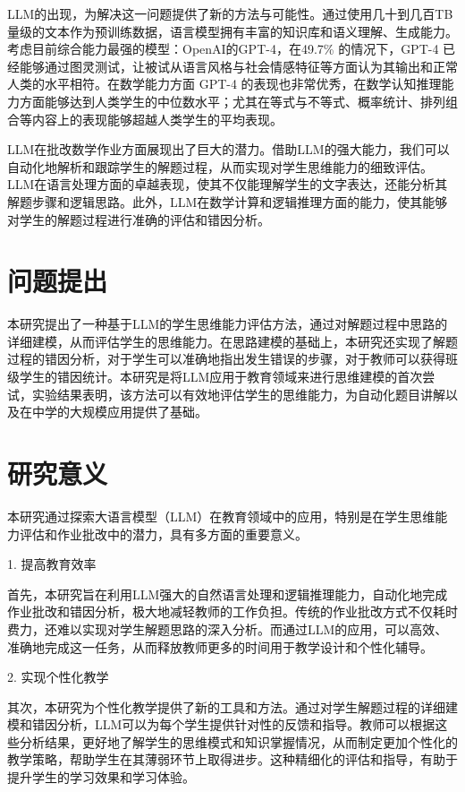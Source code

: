 LLM的出现，为解决这一问题提供了新的方法与可能性。通过使用几十到几百TB量级的文本作为预训练数据，语言模型拥有丰富的知识库和语义理解、生成能力。考虑目前综合能力最强的模型：OpenAI的GPT-4，在49.7\% 的情况下，GPT-4 已经能够通过图灵测试，让被试从语言风格与社会情感特征等方面认为其输出和正常人类的水平相符\cite{jones2024does}。在数学能力方面 GPT-4 的表现也非常优秀，在数学认知推理能力方面能够达到人类学生的中位数水平；尤其在等式与不等式、概率统计、排列组合等内容上的表现能够超越人类学生的平均表现\cite{zhuang2023efficiently}。

LLM在批改数学作业方面展现出了巨大的潜力。借助LLM的强大能力，我们可以自动化地解析和跟踪学生的解题过程，从而实现对学生思维能力的细致评估。LLM在语言处理方面的卓越表现，使其不仅能理解学生的文字表达，还能分析其解题步骤和逻辑思路。此外，LLM在数学计算和逻辑推理方面的能力，使其能够对学生的解题过程进行准确的评估和错因分析。


\section{问题提出}

本研究提出了一种基于LLM的学生思维能力评估方法，通过对解题过程中思路的详细建模，从而评估学生的思维能力。在思路建模的基础上，本研究还实现了解题过程的错因分析，对于学生可以准确地指出发生错误的步骤，对于教师可以获得班级学生的错因统计。本研究是将LLM应用于教育领域来进行思维建模的首次尝试，实验结果表明，该方法可以有效地评估学生的思维能力，为自动化题目讲解以及在中学的大规模应用提供了基础。


\section{研究意义}
本研究通过探索大语言模型（LLM）在教育领域中的应用，特别是在学生思维能力评估和作业批改中的潜力，具有多方面的重要意义。

1. 提高教育效率

首先，本研究旨在利用LLM强大的自然语言处理和逻辑推理能力，自动化地完成作业批改和错因分析，极大地减轻教师的工作负担。传统的作业批改方式不仅耗时费力，还难以实现对学生解题思路的深入分析。而通过LLM的应用，可以高效、准确地完成这一任务，从而释放教师更多的时间用于教学设计和个性化辅导。

2. 实现个性化教学

其次，本研究为个性化教学提供了新的工具和方法。通过对学生解题过程的详细建模和错因分析，LLM可以为每个学生提供针对性的反馈和指导。教师可以根据这些分析结果，更好地了解学生的思维模式和知识掌握情况，从而制定更加个性化的教学策略，帮助学生在其薄弱环节上取得进步。这种精细化的评估和指导，有助于提升学生的学习效果和学习体验。

